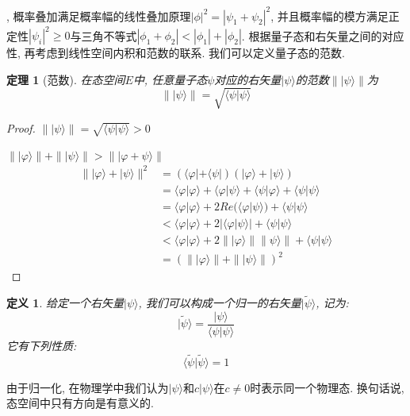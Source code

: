 \documentclass[a4paper,11pt]{article}
\newtheorem{definition}{\hspace{2em}定义}[section]
\newtheorem{theorem}{\hspace{2em}定理}[section]
\newtheorem{proof}{证明}[section]
\begin{document}
, 概率叠加满足概率幅的线性叠加原理$|\phi|^2=|\psi_1+\psi_2|^2$, 并且概率幅的模方满足正定性$|\psi_i|^2\geq 0$与三角不等式$|\phi_1+\phi_2|<|\phi_1|+|\phi_2|$. 根据量子态和右矢量之间的对应性, 再考虑到线性空间内积和范数的联系. 我们可以定义量子态的范数.
\begin{theorem}[范数]\label{ket norm}
  在态空间$E$中, 任意量子态$\psi$对应的右矢量$|\psi\rangle$的范数$\||\psi\rangle\|$为
\begin{equation*}
  \||\psi\rangle\|=\sqrt{\langle\psi|\psi\rangle}
\end{equation*}
\end{theorem}
\begin{proof}
  $\||\psi\rangle\|=\sqrt{\langle\psi|\psi\rangle}>0$

$\||\varphi\rangle\|+\||\psi\rangle\|>\||\varphi+\psi\rangle\|$
\begin{equation*}
  \begin{split}
     \||\varphi\rangle+|\psi\rangle\|^2 & =(\langle\varphi|+\langle\psi|)(|\varphi\rangle+|\psi\rangle) \\
       & =\langle\varphi|\varphi\rangle+\langle\varphi|\psi\rangle+\langle\psi|\varphi\rangle+\langle\psi|\psi\rangle \\
       & =\langle\varphi|\varphi\rangle+2Re(\langle\varphi|\psi\rangle)+\langle\psi|\psi\rangle\\
       & <\langle\varphi|\varphi\rangle+2|\langle\varphi|\psi\rangle|+\langle\psi|\psi\rangle\\
       & <\langle\varphi|\varphi\rangle+2\||\varphi\rangle\|\|\psi\rangle\|+\langle\psi|\psi\rangle\\
       & =(\||\varphi\rangle\|+\||\psi\rangle\|)^2
  \end{split}
\end{equation*}
\end{proof}
\begin{definition}\label{ket normalization}
  给定一个右矢量$|\psi\rangle$, 我们可以构成一个归一的右矢量$|\tilde{\psi}\rangle$, 记为:
\begin{equation*}
  |\tilde{\psi}\rangle=\frac{|\psi\rangle}{\langle\psi|\psi\rangle}
\end{equation*}
它有下列性质:
\begin{equation*}
  \langle\tilde{\psi}|\tilde{\psi}\rangle=1
\end{equation*}
\end{definition}
由于归一化, 在物理学中我们认为$|\psi\rangle$和$c|\psi\rangle$在$c\neq0$时表示同一个物理态. 换句话说, 态空间中只有方向是有意义的.
\end{document}
